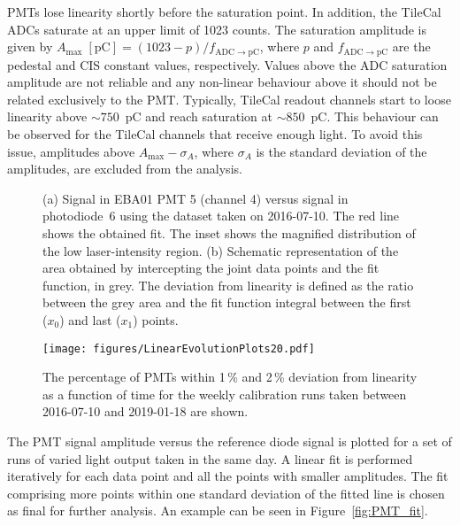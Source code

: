 PMTs lose linearity shortly before the saturation point. In addition, the TileCal ADCs saturate at an upper limit of 1023 counts. The saturation amplitude is given by $A_{\mathrm{max}}\;\mathrm{[pC]} = (1023-p)/f_\mathrm{ADC\to pC}$, where $p$ and $f_\mathrm{ADC\to pC}$ are the pedestal and CIS constant values, respectively. Values above the ADC saturation amplitude are not reliable and any non-linear behaviour above it should not be related exclusively to the PMT. Typically, TileCal readout channels start to loose linearity above $\sim750$~pC and reach saturation at $\sim850$~pC. This behaviour can be observed for the TileCal channels that receive enough light. To avoid this issue, amplitudes above $A_{\mathrm{max}} - \sigma_A$, where $\sigma_A$ is the standard deviation of the amplitudes, are excluded from the analysis.

\begin{figure}[htbp]
\centering
{}\hfill
{}
\caption{(a) Signal in EBA01 PMT 5 (channel 4) versus signal in photodiode~6 using the dataset taken on 2016-07-10. The red line shows the obtained fit. The inset shows the magnified distribution of the low laser-intensity region. (b) Schematic representation of the area obtained by intercepting the joint data points and the fit function, in grey. The deviation from linearity is defined as the ratio between the grey area and the fit function integral between the first ($x_0$) and last ($x_1$) points.}
\end{figure}

\begin{figure}[htbp]
\centering
\texttt{[image: figures/LinearEvolutionPlots20.pdf]}
\caption{The percentage of PMTs within 1\,\% and 2\,\% deviation from linearity as a function of time for the weekly calibration runs taken between 2016-07-10 and 2019-01-18 are shown.\label{fig:linearity}}
\end{figure}

The PMT signal amplitude versus the reference diode signal is plotted for a set of runs of varied light output taken in the same day. A linear fit is performed iteratively for each data point and all the points with smaller amplitudes. The fit comprising more points within one standard deviation of the fitted line is chosen as final for further analysis. 
An example can be seen in Figure~\ref{fig:PMT_fit}.


